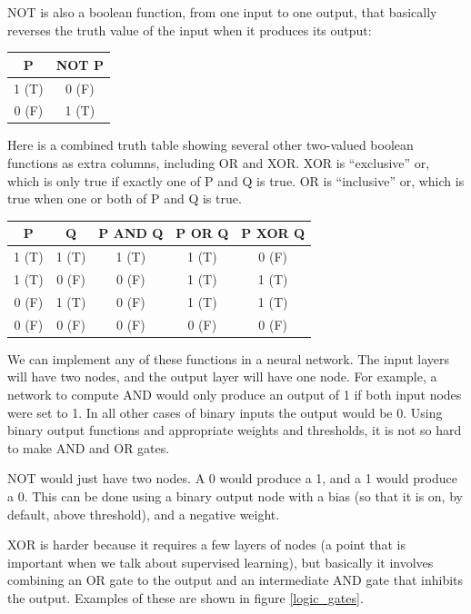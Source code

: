 NOT is also a boolean function, from one input to one output, that basically reverses the truth value of the input when it produces its output:

\begin{center}
\begin{tabular}{| c || c | }
\hline
  P  & NOT P  \\
\hline
  1 (T) & 0 (F)  \\
\hline
 0 (F) & 1 (T)  \\
\hline
\end{tabular}
\end{center}


Here is a combined truth table showing several other two-valued boolean functions as extra columns, including OR and XOR. XOR is ``exclusive'' or, which is only true if exactly one of P and Q is true. OR is ``inclusive'' or, which is true when one or both of P and Q is true.

\begin{center}
\begin{tabular}{| c | c || c || c || c | }
\hline
  P  & Q & P AND Q  & P OR Q & P XOR Q \\
\hline
  1 (T) & 1 (T) & 1 (T) & 1 (T) & 0 (F) \\
\hline
  1 (T) & 0 (F) & 0 (F) & 1 (T) & 1 (T) \\
\hline
  0 (F) & 1 (T) & 0 (F) & 1 (T) & 1 (T) \\
\hline
 0 (F) & 0 (F) & 0 (F) & 0 (F) & 0 (F) \\
\hline
\end{tabular}
\end{center}

We can implement any of these functions in a neural network. The input layers will have two nodes, and the output layer will have one node. For example, a network to compute AND would only produce an output of 1 if both input nodes were set to 1. In all other cases of binary inputs the output would be 0. Using binary output functions and appropriate weights and thresholds, it is not so hard to make AND and OR gates. 

NOT would just have two nodes. A 0 would produce a 1, and a 1 would produce a 0. This can be done using a binary output node with a bias (so that it is on, by default, above threshold), and a negative weight.

XOR is harder because it requires a few layers of nodes (a point that is important when we talk about supervised learning), but basically it involves combining an OR gate to the output and an intermediate AND gate that inhibits the output. Examples of these are shown in figure \ref{logic_gates}.

